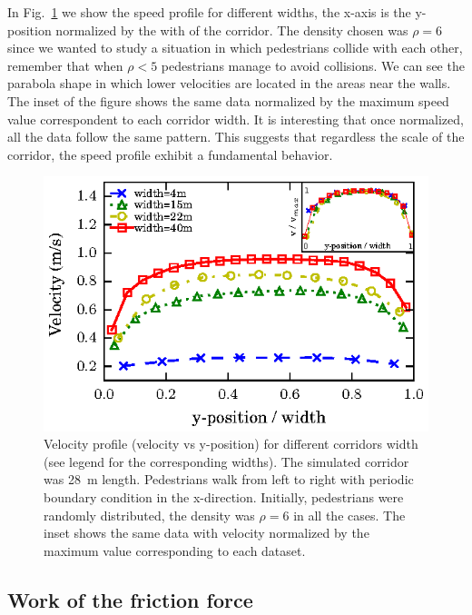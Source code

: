 In Fig.~\ref{speed-profile-multi_width} we show the speed profile for different widths, the x-axis is the y-position normalized by the with of the corridor. The density chosen was $\rho = 6$ since we wanted to study a situation in which pedestrians collide with each other, remember that when $\rho<5$ pedestrians manage to avoid collisions. We can see the parabola shape in which lower velocities are located in the areas near the walls. The inset of the figure shows the same data normalized by the maximum speed value correspondent to each corridor width. It is interesting that once normalized, all the data follow the same pattern. This suggests that regardless the scale of the corridor, the speed profile exhibit a fundamental behavior. 


\begin{figure}[htbp!]
\includegraphics[width=\columnwidth]
{plots/v(y)_multi_width.eps}
\caption{\label{speed-profile-multi_width} Velocity profile (velocity vs y-position) for different corridors width (see legend for the corresponding widths). The simulated corridor was 28~m length. Pedestrians walk from left to right with periodic boundary condition in the x-direction. Initially, pedestrians were randomly distributed, the density was $\rho = 6$ in all the cases. The inset shows the same data with velocity normalized by the maximum value corresponding to each dataset. }
\end{figure}


\subsection{Work of the friction force}


